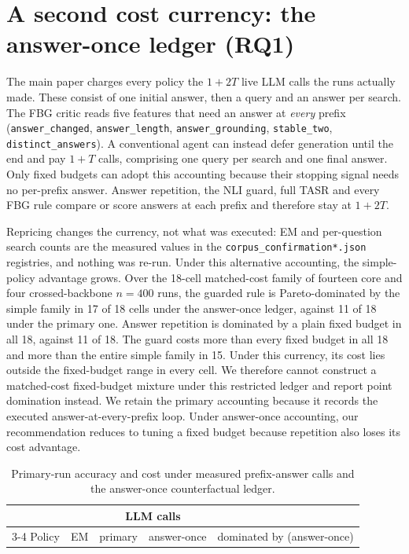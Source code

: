 \documentclass[manuscript,nonacm]{acmart}
\begin{document}
\FloatBarrier
\section{A second cost currency: the answer-once ledger (RQ1)}
\label{supp:answeronce}

The main paper charges every policy the $1{+}2T$ live LLM calls the runs
actually made. These consist of one initial answer, then a query and an answer
per search. The FBG critic reads five features that need an answer at
\emph{every} prefix (\texttt{answer\_changed}, \texttt{answer\_length},
\texttt{answer\_grounding}, \texttt{stable\_two}, \texttt{distinct\_answers}).
A conventional agent can instead defer generation until the end and pay
$1{+}T$ calls, comprising one query per search and one final answer. Only
fixed budgets can adopt this accounting because their stopping signal needs no
per-prefix answer.
Answer repetition, the NLI guard, full TASR and every FBG rule compare or score
answers at each prefix and therefore stay at $1{+}2T$.

Repricing changes the currency, not what was executed: EM and per-question
search counts are the measured values in the
\texttt{corpus\_confirmation*.json} registries, and nothing was re-run.
Under this alternative accounting, the simple-policy advantage grows. Over the
18-cell matched-cost family of fourteen core and four crossed-backbone
$n{=}400$ runs, the guarded rule is Pareto-dominated by the
simple family in 17 of 18 cells under the answer-once ledger, against 11 of 18
under the primary one. Answer repetition is dominated by a plain fixed budget
in all 18, against 11 of 18. The guard costs more than every fixed budget in
all 18 and more than the entire simple family in 15. Under this currency, its
cost lies outside the fixed-budget range in every cell. We therefore cannot
construct a matched-cost fixed-budget mixture under this restricted ledger and report point domination
instead. We retain the primary accounting because it records the executed
answer-at-every-prefix loop. Under answer-once accounting, our recommendation
reduces to tuning a fixed budget because repetition also loses its cost
advantage.

\begin{table}[htbp]
\caption{Primary-run accuracy and cost under measured prefix-answer calls and
the answer-once counterfactual ledger.}
\label{tab:supp-answeronce}
\footnotesize
\setlength{\tabcolsep}{4pt}
\begin{tabular}{lrrrl}
\toprule
& & \multicolumn{2}{c}{LLM calls} & \\
\cmidrule(lr){3-4}
Policy & EM & primary & answer-once & dominated by (answer-once) \\
\midrule

\bottomrule
\end{tabular}
\end{table}
\end{document}
